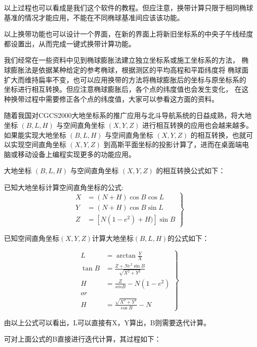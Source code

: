 以上过程也可以看成是我们这个软件的教程。但应注意，换带计算只限于相同椭球
基准的情况才能应用，不能在不同椭球基准间应该该功能。

以上换带功能也可以设计一个界面，在新的界面上将新旧坐标系的中央子午线经度
都设置出，从而完成一键式换带计算功能。

我们经常在一些资料中见到椭球膨胀法建立独立坐标系或施工坐标系的方法，
椭球膨胀法是依据某种给定的参考椭球，根据测区的平均高程和平距纬度将
椭球面扩大而维持扁率不变，也可以应用换带的方法将椭球膨胀后的坐标与原坐标系的
坐标进行相互转换。但应注意椭球膨胀后，各个点的纬度值也会发生变化，
在这种换带过程中需要修正各个点的纬度值，大家可以参看这方面的资料。

随着我国对CGCS2000大地坐标系的推广应用与北斗导航系统的日益成熟，将大地坐标 $(B, L, H)$
与空间直角坐标 $(X, Y, Z)$ 进行相互转换的应用也会越来越多。如果能实现大地坐标 $(B, L, H)$
与空间直角坐标 $(X, Y, Z)$ 的相互转换，也就可以实现空间直角坐标 $(X, Y, Z)$
到高斯平面坐标的投影计算了，进而在桌面端电脑或移动设备上编程实现更多的功能应用。

大地坐标 $(B, L, H)$ 与空间直角坐标 $(X, Y, Z)$ 的相互转换公式如下：

已知大地坐标计算空间直角坐标的公式:
\begin{equation}
\left .
\begin{aligned}
X &= (N+H) \cos B \cos L \\
Y &= (N+H) \cos B \sin L \\
Z &= [N(1 - e^2) + H)] \sin B 
\end{aligned} 
\right \}
\end{equation}

已知空间直角坐标$(X,Y,Z)$计算大地坐标$(B, L, H)$的公式如下：

\begin{equation}
\left . 
\begin{aligned}
L &= \arctan \frac{Y}{X} \\
\tan B &= \frac{Z + Ne^2 \sin B}{\sqrt{X^2 + Y^2}} \\
H &= \frac{Z}{sinB} - N(1-e^2)  \\
 or  \\
H &=\frac{\sqrt{X^2 + Y^2}}{\cos B} - N 
\end{aligned} 
\right \}
\end{equation}

由以上公式可以看出，L可以直接有X，Y算出，B则需要迭代计算。

可对上面公式的B直接进行迭代计算，其过程如下：


